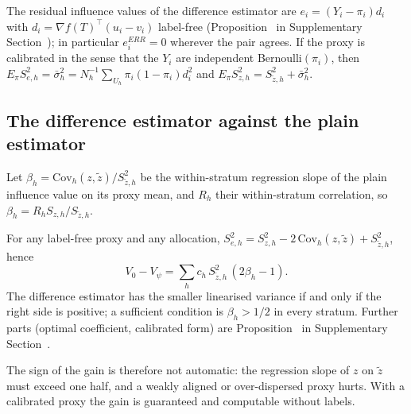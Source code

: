The residual influence values of the difference estimator are $e_i=(Y_i-\pi_i)d_i$ with $d_i=\nabla f(T)^\top(u_i-v_i)$ label-free
(Proposition~ in Supplementary Section~); in particular $e^{ERR}_i=0$ wherever the pair agrees. If the proxy is calibrated in the
sense that the $Y_i$ are independent Bernoulli$(\pi_i)$, then $E_\pi S^2_{e,h}=\bar\sigma^2_h=N_h^{-1}\sum_{U_h}\pi_i(1-\pi_i)d_i^2$ and
$E_\pi S^2_{z,h}=S^2_{\tilde z,h}+\bar\sigma^2_h$.

\subsection{The difference estimator against the plain estimator}\label{sec:theory-dif}

Let $\beta_h=\mathrm{Cov}_h(z,\tilde z)/S^2_{\tilde z,h}$ be the within-stratum regression slope of the plain influence value on its proxy
mean, and $R_h$ their within-stratum correlation, so $\beta_h=R_hS_{z,h}/S_{\tilde z,h}$.

\begin{proposition}\label{prop:dif-var}
For any label-free proxy and any allocation, $S^2_{e,h}=S^2_{z,h}-2\,\mathrm{Cov}_h(z,\tilde z)+S^2_{\tilde z,h}$, hence
\begin{equation}\label{eq:dif-identity}
V_0-V_\psi=\sum_hc_h\,S^2_{\tilde z,h}\,(2\beta_h-1).
\end{equation}
The difference estimator has the smaller linearised variance if and only if the right side is positive; a sufficient condition is
$\beta_h>1/2$ in every stratum. Further parts (optimal coefficient, calibrated form) are Proposition~ in Supplementary Section~.
\end{proposition}

The sign of the gain is therefore not automatic: the regression slope of $z$ on $\tilde z$ must exceed one half, and a weakly aligned or
over-dispersed proxy hurts. With a calibrated proxy the gain is guaranteed and computable without labels.

